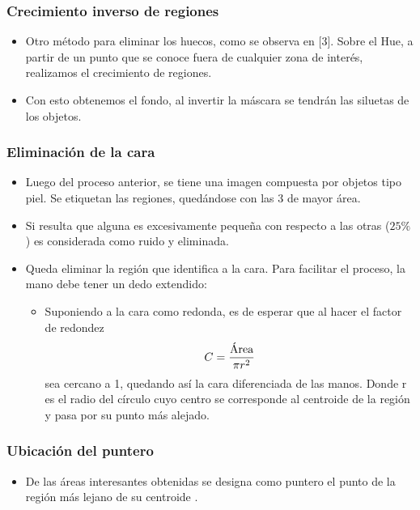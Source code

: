 \documentclass[portrait,a0paper,fontscale=0.277]{baposter}
\newcommand{\compresslist}{%
\setlength{\itemsep}{0pt}%
\setlength{\parskip}{0pt}%
\setlength{\parsep}{0pt}%
}
\begin{document}
\begin{poster}
{		\subsubsection*{Crecimiento inverso de regiones}

			\begin{itemize}\compresslist	
			 \item Otro método  para  eliminar  los  huecos, como se observa en [3].
					Sobre el Hue, a partir de  un  punto  que  se conoce fuera de cualquier zona de  interés,  realizamos  el  crecimiento  de
					regiones. 
\item Con esto obtenemos el fondo, al invertir  la  máscara  se tendrán
					las siluetas de los objetos.
			\end{itemize}	
		\subsubsection*{Eliminación de la cara}
			\begin{itemize}\compresslist	
			\item Luego del proceso anterior, se tiene una imagen compuesta por  objetos  tipo
			piel. Se etiquetan las  regiones, quedándose con las 3  de  mayor
			área.
			\item Si resulta que  alguna  es  excesivamente
			pequeña con respecto a  las  otras  ($25 \%$)  es  considerada  como  ruido  y
			eliminada.

			\item Queda  eliminar la región que identifica a la cara. Para facilitar el proceso, la mano debe
			tener un dedo extendido: 
			\begin{itemize}\compresslist
			\item Suponiendo a la cara como redonda, es de esperar
			que al hacer el factor de  redondez
			\[ C = \frac{\makebox{Área}}{\pi r^2}\]
			sea cercano a 1, quedando así la cara diferenciada de las manos. Donde r  es
			el radio del círculo cuyo centro se corresponde al centroide de la región  y
			pasa por su punto más alejado.%
			\end{itemize}
			\end{itemize}
		\subsubsection*{Ubicación del puntero}
		\begin{itemize}\compresslist
		\item De las áreas interesantes obtenidas se designa como puntero el punto de la región  más lejano de su centroide .
		\end{itemize}
	}


\end{poster}
\end{document}
